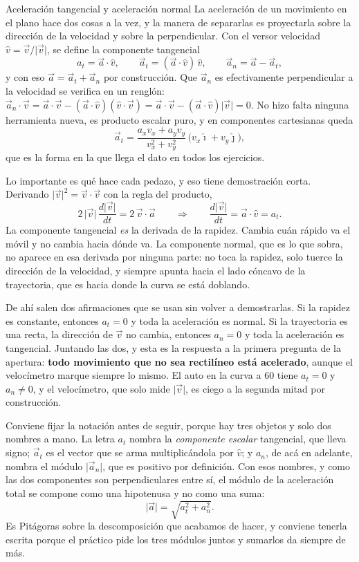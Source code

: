 \documentclass[11pt,openany]{book}
\begin{document}
\begin{bloque}{Aceleración tangencial y aceleración normal}
La aceleración de un movimiento en el plano hace dos cosas a la vez, y la manera de separarlas es proyectarla sobre la dirección de la velocidad y sobre la perpendicular. Con el versor velocidad $\hat v = \vec v/\lvert\vec v\rvert$, se define la componente tangencial
\[
a_t = \vec a\cdot\hat v, \qquad \vec a_t = (\vec a\cdot\hat v)\,\hat v, \qquad \vec a_n = \vec a - \vec a_t,
\]
y con eso $\vec a = \vec a_t + \vec a_n$ por construcción. Que $\vec a_n$ es efectivamente perpendicular a la velocidad se verifica en un renglón: $\vec a_n\cdot\vec v = \vec a\cdot\vec v - (\vec a\cdot\hat v)(\hat v\cdot\vec v) = \vec a\cdot\vec v - (\vec a\cdot\hat v)\lvert\vec v\rvert = 0$. No hizo falta ninguna herramienta nueva, es producto escalar puro, y en componentes cartesianas queda
\[
\vec a_t = \frac{a_xv_x + a_yv_y}{v_x^2+v_y^2}\,\big(v_x\hat\imath + v_y\hat\jmath\big),
\]
que es la forma en la que llega el dato en todos los ejercicios.

Lo importante es qué hace cada pedazo, y eso tiene demostración corta. Derivando $\lvert\vec v\rvert^2 = \vec v\cdot\vec v$ con la regla del producto,
\[
2\,\lvert\vec v\rvert\,\frac{d\lvert\vec v\rvert}{dt} = 2\,\vec v\cdot\vec a
\qquad\Longrightarrow\qquad
\frac{d\lvert\vec v\rvert}{dt} = \vec a\cdot\hat v = a_t.
\]
La componente tangencial \emph{es} la derivada de la rapidez. Cambia cuán rápido va el móvil y no cambia hacia dónde va. La componente normal, que es lo que sobra, no aparece en esa derivada por ninguna parte: no toca la rapidez, solo tuerce la dirección de la velocidad, y siempre apunta hacia el lado cóncavo de la trayectoria, que es hacia donde la curva se está doblando.

De ahí salen dos afirmaciones que se usan sin volver a demostrarlas. Si la rapidez es constante, entonces $a_t = 0$ y toda la aceleración es normal. Si la trayectoria es una recta, la dirección de $\vec v$ no cambia, entonces $a_n = 0$ y toda la aceleración es tangencial. Juntando las dos, y esta es la respuesta a la primera pregunta de la apertura: \textbf{todo movimiento que no sea rectilíneo está acelerado}, aunque el velocímetro marque siempre lo mismo. El auto en la curva a 60 tiene $a_t = 0$ y $a_n \neq 0$, y el velocímetro, que solo mide $\lvert\vec v\rvert$, es ciego a la segunda mitad por construcción.

Conviene fijar la notación antes de seguir, porque hay tres objetos y solo dos nombres a mano. La letra $a_t$ nombra la \emph{componente escalar} tangencial, que lleva signo; $\vec a_t$ es el vector que se arma multiplicándola por $\hat v$; y $a_n$, de acá en adelante, nombra el módulo $\lvert\vec a_n\rvert$, que es positivo por definición. Con esos nombres, y como las dos componentes son perpendiculares entre sí, el módulo de la aceleración total se compone como una hipotenusa y no como una suma:
\[
\lvert\vec a\rvert = \sqrt{a_t^2 + a_n^2}.
\]
Es Pitágoras sobre la descomposición que acabamos de hacer, y conviene tenerla escrita porque el práctico pide los tres módulos juntos y sumarlos da siempre de más.


\end{bloque}
\end{document}
